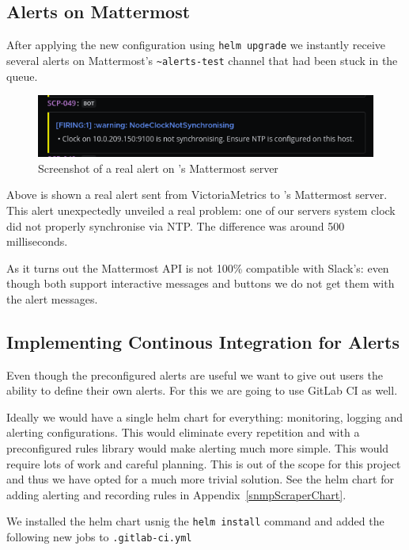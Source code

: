 \newpage

\subsection{Alerts on Mattermost}

After applying the new configuration using \verb+helm upgrade+ we instantly
receive several alerts on Mattermost's \verb+~alerts-test+ channel that had
been stuck in the queue.

\begin{figure}[!h]
	\centering
	\includegraphics[width=150mm, keepaspectratio]{figures/mattermost-alert-x-ray.png}
	\caption{Screenshot of a real alert on \kszk's Mattermost server}
\end{figure}

Above is shown a real alert sent from VictoriaMetrics to \kszk's Mattermost
server. This alert unexpectedly unveiled a real problem: one of our servers
system clock did not properly synchronise via NTP. The difference was around
500 milliseconds.

As it turns out the Mattermost API is not 100\% compatible with Slack's: even
though both support interactive messages and buttons we do not get them with
the alert messages.

\subsection{Implementing Continous Integration for Alerts}

Even though the preconfigured alerts are useful we want to give out users the
ability to define their own alerts. For this we are going to use GitLab CI as
well.

Ideally we would have a single helm chart for everything: monitoring, logging
and alerting configurations. This would eliminate every repetition and with a
preconfigured rules library would make alerting much more simple. This would
require lots of work and careful planning. This is out of the scope for this
project and thus we have opted for a much more trivial solution. See the helm
chart for adding alerting and recording rules in
Appendix~\ref{snmpScraperChart}.

We installed the helm chart usnig the \verb+helm install+ command and added the
following new jobs to \verb+.gitlab-ci.yml+


